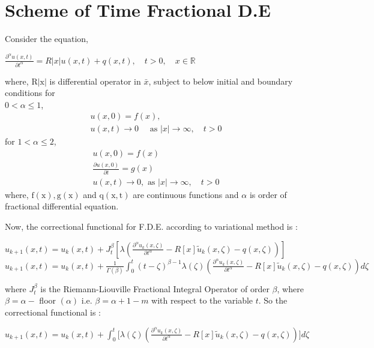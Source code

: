 \documentclass[12pt, a4paper]{report}
\begin{document}
\section{Scheme of Time Fractional D.E}
Consider the equation, 
\begin{center}
$\frac{\partial^\alpha u(x, t)}{\partial t^\alpha}=R|x| u(x, t)+q(x, t), \quad t > 0, \quad x \in \mathbb{R}$
\end{center}
where, $\mathrm{R}|\mathrm{x}|$ is differential operator in $\bar{x}$, subject to below initial and boundary conditions for\\
$0<\alpha \leq 1$,
$$
\begin{gathered}
u(x, 0)=f(x) ,\\
u(x, t) \rightarrow 0 \quad \text { as }|x| \rightarrow \infty, \quad t>0
\end{gathered}
$$
for $1<\alpha \leq 2$,
$$ \begin{array}{r}
u(x, 0)=f(x) \\
\frac{\partial u(x, 0)}{\partial t}=g(x) \\
u(x, t) \rightarrow 0 , \text { as }|x| \rightarrow \infty, \quad t>0
\end{array} $$
where, $\mathrm{f}(\mathrm{x}), \mathrm{g}(\mathrm{x})$ and $\mathrm{q}(\mathrm{x}, \mathrm{t})$ are continuous functions and $\alpha$ is order of fractional differential equation.

Now, the correctional functional for F.D.E. according to variational method is :
\begin{center}
    $u_{k+1}(x, t) = u_k(x, t) + J_t^\beta\left[\lambda\left(\frac{\partial^\alpha u_k(x, \zeta)}{\partial t^\alpha} - R[x] \tilde{u}_k(x, \zeta) - q(x, \zeta)\right)\right]$ \\
    $u_{k+1}(x, t) = u_k(x, t) + \frac{1}{\Gamma(\beta)} \int_0^t (t - \zeta)^{\beta - 1} \lambda(\zeta) \left(\frac{\partial^\alpha u_k(x, \zeta)}{\partial t^\alpha} - R[x] \tilde{u}_k(x, \zeta) - q(x, \zeta)\right) d\zeta$
\end{center}

where $J_t^\beta$ is the Riemann-Liouville Fractional Integral Operator of order $\beta$, where $\beta=\alpha-$ floor $(\alpha)$ i.e. $\beta=\alpha+1-m$ with respect to the variable $t$. So the correctional functional is :
\begin{center}
    $u_{k+1}(x, t) = u_k(x, t) + \int_0^t \Biggl[\lambda(\zeta) \left(\frac{\partial^\alpha u_k(x, \zeta)}{\partial t^\alpha} - R[x] \tilde{u}_k(x, \zeta) - q(x, \zeta)\right)\Biggr] d\zeta$
\end{center}
\end{document}
